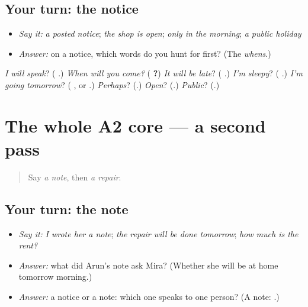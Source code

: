 \subsection*{Your turn: the notice}
\begin{itemize}
\raggedright
  \item \emph{Say it:} \emph{a posted notice}; \emph{the shop is open}; \emph{only in the morning}; \emph{a public holiday}
  \item \emph{Answer:} on a notice, which words do you hunt for first? (The \emph{whens}.)
\end{itemize}

\begin{tcolorbox}[breakable,colback=teal!4,colframe=teal!35!black,title={Before you move on}]
\emph{I will speak}? (\textbf{ }.) \emph{When will you come?} (\textbf{  ?}) \emph{It will be late}? (\textbf{ }.) \emph{I'm sleepy}? (\textbf{   }.) \emph{I'm going tomorrow}? (\textbf{   }, or \textbf{ }.) \emph{Perhaps}? (\textbf{}.) \emph{Open}? (\textbf{}.) \emph{Public}? (\textbf{}.)
\end{tcolorbox}
\section[(dialogue)]{The whole A2 core — a second pass}

\label{lesson:GU-R152-second-pass-core}



\begin{quote}
Say \emph{a note}, then \emph{a repair}.
\end{quote}

\subsection*{Your turn: the note}
\begin{itemize}
\raggedright
  \item \emph{Say it:} \emph{I wrote her a note}; \emph{the repair will be done tomorrow}; \emph{how much is the rent?}
  \item \emph{Answer:} what did Arun's note ask Mira? (Whether she will be at home tomorrow morning.)
  \item \emph{Answer:} a notice or a note: which one speaks to one person? (A note: \textbf{}.)
\end{itemize}


